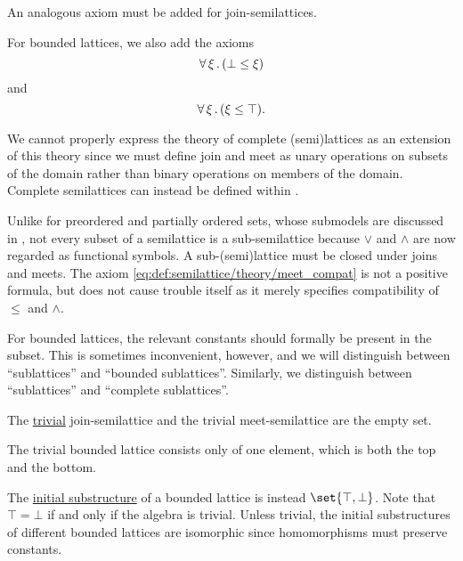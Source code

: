 \begin{definition}
\begin{thmenum}[resume=def:semilattice]
    An analogous axiom must be added for join-semilattices.

    For bounded lattices, we also add the axioms
    \begin{equation}\label{eq:def:semilattice/theory/bottom_compat}
      \forall \thinspace \xi \thinspace . \thinspace (\bot \leq \xi)
    \end{equation}
    and
    \begin{equation}\label{eq:def:semilattice/theory/top_compat}
      \forall \thinspace \xi \thinspace . \thinspace (\xi \leq \top).
    \end{equation}

    We cannot properly express the theory of complete (semi)lattices as an extension of this theory since we must define join and meet as unary operations on subsets of the domain rather than binary operations on members of the domain. Complete semilattices can instead be defined within \hyperref[def:zfc]{}.

     Unlike for preordered and partially ordered sets, whose submodels are discussed in , not every subset of a semilattice is a sub-semilattice because \( \vee \) and \( \wedge \) are now regarded as functional symbols. A sub-(semi)lattice must be closed under joins and meets. The axiom \eqref{eq:def:semilattice/theory/meet_compat} is not a positive formula, but does not cause trouble itself as it merely specifies compatibility of \( \leq \) and \( \wedge \).

    For bounded lattices, the relevant constants should formally be present in the subset. This is sometimes inconvenient, however, and we will distinguish between \enquote{sublattices} and \enquote{bounded sublattices}. Similarly, we distinguish between \enquote{sublattices} and \enquote{complete sublattices}.

     The \hyperref[rem:trivial_structure]{trivial} join-semilattice and the trivial meet-semilattice are the empty set.

    The trivial bounded lattice consists only of one element, which is both the top and the bottom.

     The \hyperref[thm:substructures_form_complete_lattice/bottom]{initial substructure} of a bounded lattice is instead \( \set{ \top, \bot } \). Note that \( \top = \bot \) if and only if the algebra is trivial. Unless trivial, the initial substructures of different bounded lattices are isomorphic since homomorphisms must preserve constants.


\end{thmenum}
\end{definition}
